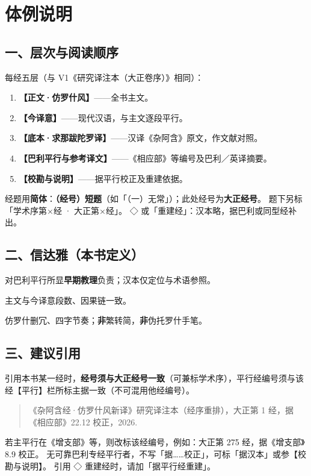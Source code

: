
\chapter*{体例说明}

\section*{一、层次与阅读顺序}

每经五层（与 V1《研究译注本（大正卷序）》相同）：

\begin{enumerate}[label=\textbf{\arabic*.}]
  \item \textbf{【正文·仿罗什风】}——全书主文。
  \item \textbf{【今译意】}——现代汉语，与主文逐段平行。
  \item \textbf{【底本·求那跋陀罗译】}——汉译《杂阿含》原文，作文献对照。
  \item \textbf{【巴利平行与参考译文】}——《相应部》等编号及巴利／英译摘要。
  \item \textbf{【校勘与说明】}——据平行校正及重建依据。
\end{enumerate}

经题用\textbf{简体}：\textbf{（经号）短题}（如「（一）无常」）；此处经号为\textbf{大正经号}。
题下另标「学术序第×经 · 大正第×经」。
◇ 或「重建经」：汉本略，据巴利或同型经补出。

\section*{二、信达雅（本书定义）}

\begin{description}[style=nextline,leftmargin=3em]
  \item[信] 对巴利平行所显\textbf{早期教理}负责；汉本仅定位与术语参照。
  \item[达] 主文与今译意段数、因果链一致。
  \item[雅] 仿罗什删冗、四字节奏；\textbf{非}繁转简，\textbf{非}伪托罗什手笔。
\end{description}

\section*{三、建议引用}

引用本书某一经时，\textbf{经号须与大正经号一致}（可兼标学术序），平行经编号须与该经【平行】栏所标主据一致（不可混用他经编号）。

\begin{quote}\small
《杂阿含经·仿罗什风新译》研究译注本（经序重排），大正第 1 经，据《相应部》22.12 校正，2026.
\end{quote}

\noindent 若主平行在《增支部》等，则改标该经编号，例如：大正第 275 经，据《增支部》8.9 校正。
无可靠巴利专经平行者，不写「据……校正」，可标「据汉本」或参【校勘与说明】。
引用 ◇ 重建经时，请加「据平行经重建」。

\clearpage
